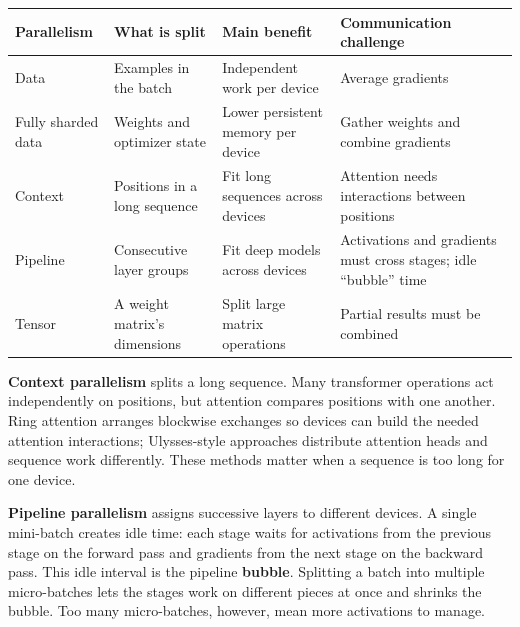 {\def\LTcaptype{none} %
\begin{longtable}[]{@{}
  >{\raggedright\arraybackslash}p{}
  >{\raggedright\arraybackslash}p{}
  >{\raggedright\arraybackslash}p{}
  >{\raggedright\arraybackslash}p{}@{}}
\toprule\noalign{}
\begin{minipage}[b]{\linewidth}\raggedright
Parallelism
\end{minipage} & \begin{minipage}[b]{\linewidth}\raggedright
What is split
\end{minipage} & \begin{minipage}[b]{\linewidth}\raggedright
Main benefit
\end{minipage} & \begin{minipage}[b]{\linewidth}\raggedright
Communication challenge
\end{minipage} \\
\midrule\noalign{}
\endhead
\bottomrule\noalign{}
\endlastfoot
Data & Examples in the batch & Independent work per device & Average gradients \\
Fully sharded data & Weights and optimizer state & Lower persistent memory per device & Gather weights and combine gradients \\
Context & Positions in a long sequence & Fit long sequences across devices & Attention needs interactions between positions \\
Pipeline & Consecutive layer groups & Fit deep models across devices & Activations and gradients must cross stages; idle ``bubble'' time \\
Tensor & A weight matrix's dimensions & Split large matrix operations & Partial results must be combined \\
\end{longtable}
}

\textbf{Context parallelism} splits a long sequence. Many transformer operations act independently on positions, but attention compares positions with one another. Ring attention arranges blockwise exchanges so devices can build the needed attention interactions; Ulysses-style approaches distribute attention heads and sequence work differently. These methods matter when a sequence is too long for one device.

\textbf{Pipeline parallelism} assigns successive layers to different devices. A single mini-batch creates idle time: each stage waits for activations from the previous stage on the forward pass and gradients from the next stage on the backward pass. This idle interval is the pipeline \textbf{bubble}. Splitting a batch into multiple micro-batches lets the stages work on different pieces at once and shrinks the bubble. Too many micro-batches, however, mean more activations to manage.

